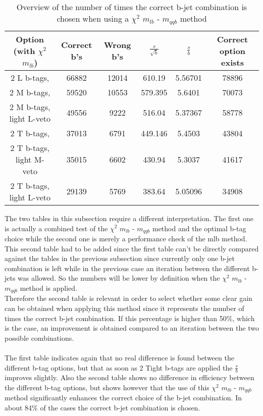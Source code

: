  \begin{table}[!h] 
 \begin{tabular}{c|c|c|c|c|c} 
 \textbf{Option} (with $\chi^{2}$ $m_{lb}$) & Correct b's & Wrong b's & $\frac{s}{\sqrt{b}}$ & $\frac{s}{b}$ & Correct option exists \\ \hline 
2 L b-tags,                & 66882 & 12014 & 610.19 & 5.56701 & 78896 \\ 
2 M b-tags,              & 59520 & 10553 & 579.395 & 5.6401 & 70073 \\ 
2 M b-tags, light L-veto & 49556 & 9222 & 516.04 & 5.37367 & 58778 \\ 
2 T b-tags,              & 37013 & 6791 & 449.146 & 5.4503 & 43804 \\ 
2 T b-tags, light M-veto & 35015 & 6602 & 430.94 & 5.3037 & 41617 \\ 
2 T b-tags, light L-veto & 29139 & 5769 & 383.64 & 5.05096 & 34908 \\ 
 \end{tabular} 
 \caption{Overview of the number of times the correct b-jet combination is chosen when using a $\chi^{2}$ $m_{lb}$ - $m_{qqb}$ method} 
 \end{table}
 
The two tables in this subsection require a different interpretation. The first one is actually a combined test of the $\chi^{2}$ $m_{lb}$ - $m_{qqb}$ method and the optimal b-tag choice while the second one is merely a performance check of the mlb method. \\
This second table had to be added since the first table can't be directly compared against the tables in the previous subsection since currently only one b-jet combination is left while in the previous case an iteration between the different b-jets was allowed. So the numbers will be lower by definition when the $\chi^{2}$ $m_{lb}$ - $m_{qqb}$ method is applied.\\
Therefore the second table is relevant in order to select whether some clear gain can be obtained when applying this method since it represents the number of times the correct b-jet combination. If this percentage is higher than 50$\%$, which is the case, an improvement is obtained compared to an iteration between the two possible combinations.\\
\\
The first table indicates again that no real difference is found between the different b-tag options, but that as soon as 2 Tight b-tags are applied the $\frac{s}{b}$ improves slightly. Also the second table shows no difference in efficiency between the different b-tag options, but shows however that the use of this $\chi^{2}$ $m_{lb}$ - $m_{qqb}$ method significantly enhances the correct choice of the b-jet combination. In about 84$\%$ of the cases the correct b-jet combination is chosen. 

